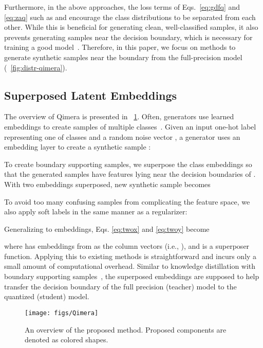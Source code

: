 \documentclass{article}
\newcommand{\aname}{Qimera\xspace}
\begin{document}
Furthermore, in the above approaches, the loss terms of Eqs.~\ref{eq:gdfq} and \ref{eq:zaq} such as  and  encourage the class distributions to be separated from each other. 
While this is beneficial for generating clean, well-classified samples, it also prevents generating samples near the decision boundary, which is necessary for training a good model~\cite{heo2019knowledge, dong2020adversarial}. 
Therefore, in this paper, we focus on methods to generate synthetic samples near the boundary from the full-precision model  (\figurename~\ref{fig:distr-qimera}).



\subsection{Superposed Latent Embeddings}
The overview of \aname is presented in \figurename~\ref{fig:qimera}.
Often, generators use learned embeddings to create samples of multiple classes~\cite{acgan, stylegan}.
Given an input one-hot label  representing one of  classes and a random noise vector , a generator  uses an embedding layer  to create a synthetic sample :

To create boundary supporting samples, we superpose the class embeddings so that the generated samples 
have features lying near the decision boundaries of .
With two embeddings superposed, new synthetic sample  becomes 

To avoid too many confusing samples from complicating the feature space, we also apply soft labels in the same manner as a regularizer:

Generalizing to  embeddings, Eqs. \ref{eq:twox} and \ref{eq:twoy} become

where  has  embeddings from  as the column vectors 
(i.e., ), 
and  is a superposer function. Applying this to existing methods is straightforward and incurs only a small amount of computational overhead.
Similar to knowledge distillation with boundary supporting samples~\cite{heo2019knowledge,dong2020adversarial}, the superposed embeddings are supposed to help transfer the decision boundary of the full precision (teacher) model to the quantized (student) model. 




\begin{figure}
\centering
	\texttt{[image: figs/Qimera]}
\caption{An overview of the proposed method.
	Proposed components are denoted as colored shapes.} 
	\label{fig:qimera}
\end{figure}
\end{document}
